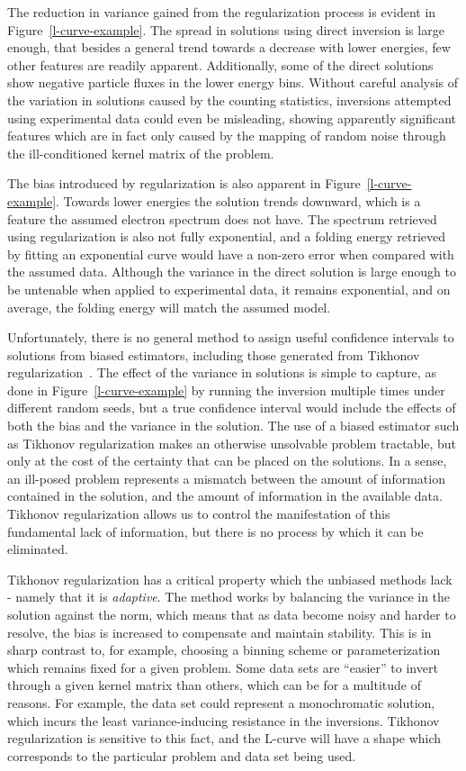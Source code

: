 The reduction in variance gained from the regularization process is evident in Figure~\ref{l-curve-example}. The spread in solutions using direct inversion is large enough, that besides a general trend towards a decrease with lower energies, few other features are readily apparent. Additionally, some of the direct solutions show negative particle fluxes in the lower energy bins. Without careful analysis of the variation in solutions caused by the counting statistics, inversions attempted using experimental data could even be misleading, showing apparently significant features which are in fact only caused by the mapping of random noise through the ill-conditioned kernel matrix of the problem. 

The bias introduced by regularization is also apparent in Figure~\ref{l-curve-example}. Towards lower energies the solution trends downward, which is a feature the assumed electron spectrum does not have. The spectrum retrieved using regularization is also not fully exponential, and a folding energy retrieved by fitting an exponential curve would have a non-zero error when compared with the assumed data. Although the variance in the direct solution is large enough to be untenable when applied to experimental data, it remains exponential, and on average, the folding energy will match the assumed model. 

Unfortunately, there is no general method to assign useful confidence intervals to solutions from biased estimators, including those generated from Tikhonov regularization~\citep{Goeman2012}. The effect of the variance in solutions is simple to capture, as done in Figure~\ref{l-curve-example} by running the inversion multiple times under different random seeds, but a true confidence interval would include the effects of both the bias and the variance in the solution. The use of a biased estimator such as Tikhonov regularization  makes an otherwise unsolvable problem tractable, but only at the cost of the certainty that can be placed on the solutions. In a sense, an ill-posed problem represents a mismatch between the amount of information contained in the solution, and the amount of information in the available data. Tikhonov regularization allows us to control the manifestation of this fundamental lack of information, but there is no process by which it can be eliminated. 

 Tikhonov regularization has a critical property which the unbiased methods lack - namely that it is \textit{adaptive}. The method works by balancing the variance in the solution against the norm, which means that as data become noisy and harder to resolve, the bias is increased to compensate and maintain stability. This is in sharp contrast to, for example, choosing a binning scheme or parameterization which remains fixed for a given problem. Some data sets are ``easier'' to invert through a given kernel matrix than others, which can be for a multitude of reasons. For example, the data set could represent a monochromatic solution, which incurs the least variance-inducing resistance in the inversions. Tikhonov regularization is sensitive to this fact, and the L-curve will have a shape which corresponds to the particular problem and data set being used. 

